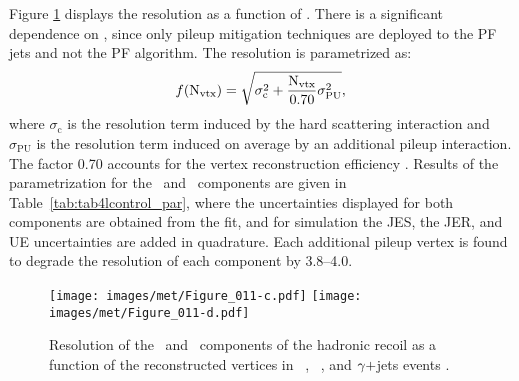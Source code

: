 \newpara
\noindent\justify
Figure \ref{fig:resolution_vert} displays the resolution as a function of \nvtx. 
There is a significant dependence on \nvtx, since only pileup mitigation techniques are deployed to the PF jets and not the PF \ptmiss algorithm. 
The resolution is parametrized as:
\begin{equation} \label{eq:npv}
f(\mathrm{N}_{\mathrm{vtx}}) = \sqrt{\sigma_{\mathrm{c}}^2 + \frac{\mathrm{N}_{\mathrm{vtx}}}{0.70}\sigma_{\mathrm{\mathrm{PU}}}^2},
\end{equation}
where $\sigma_{\mathrm{c}}$ is the resolution term induced by the hard scattering interaction and $\sigma_{\mathrm{\mathrm{PU}}}$ is the resolution term induced on average by an additional pileup interaction. 
The factor 0.70 accounts for the vertex reconstruction efficiency \cite{CMS-DP-2017-015}. 
Results of the parametrization for the \upar\ and \uperp\ components are given in Table~\ref{tab:tab4lcontrol_par}, where the uncertainties displayed for both components are obtained from the fit, and for simulation the JES, the JER, and UE uncertainties are added in quadrature.
Each additional pileup vertex is found to degrade the resolution of each component by 3.8--4.0\GeV.
\begin{figure}[htbp!]
  \centering
   \texttt{[image: images/met/Figure\_011-c.pdf]}
   \texttt{[image: images/met/Figure\_011-d.pdf]}
  \caption{Resolution of the \upar\ and \uperp\ components of the hadronic recoil as a function of the reconstructed vertices in \Zmm\ , \Zee\ , and $\gamma+$jets events \cite{Sirunyan:2019kia}.} 
  \label{fig:resolution_vert}
\end{figure}                
